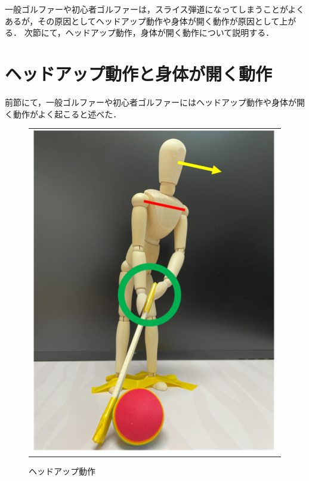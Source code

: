 一般ゴルファーや初心者ゴルファーは，スライス弾道になってしまうことがよくあるが，その原因としてヘッドアップ動作や身体が開く動作が原因として上がる．
次節にて，ヘッドアップ動作，身体が開く動作について説明する．

\section{ヘッドアップ動作と身体が開く動作}
前節にて，一般ゴルファーや初心者ゴルファーにはヘッドアップ動作や身体が開く動作がよく起こると述べた．

\begin{figure}
    \begin{center}
        \begin{tabular}{c}
            \begin{minipage}{0.5\hsize}
                \begin{center}
                    \includegraphics{./images/headup.png}
                    \caption{ヘッドアップ動作}
                    \label{headup}
                \end{center}
            \end{minipage}


\end{tabular}
\end{center}
\end{figure}
